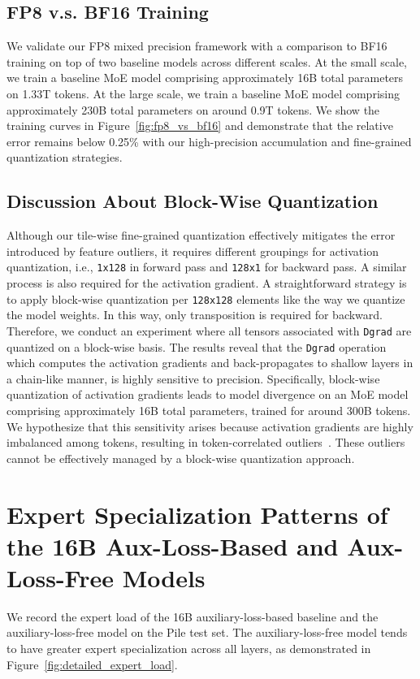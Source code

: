 \documentclass[11pt, a4paper, logo, copyright, nonumbering]{deepseek}
\begin{document}
\begin{CJK*}{UTF8}{gbsn}
\subsection{FP8 v.s. BF16 Training}
\label{app:fp8_cp_bf16}
We validate our FP8 mixed precision framework with a comparison to BF16 training on top of two baseline models across different scales. At the small scale, we train a baseline MoE model comprising approximately 16B total parameters on 1.33T tokens. 
At the large scale, we train a baseline MoE model comprising approximately 230B total parameters on around 0.9T tokens. We show the training curves in Figure~\ref{fig:fp8_vs_bf16} and demonstrate that the relative error remains below 0.25\% with our high-precision accumulation and fine-grained quantization strategies.

\subsection{Discussion About Block-Wise Quantization}
\label{app:fp8_blockwise}
Although our tile-wise fine-grained quantization effectively mitigates the error introduced by feature outliers, it requires different groupings for activation quantization, i.e., \texttt{1x128} in forward pass and \texttt{128x1} for backward pass. 
A similar process is also required for the activation gradient. 
A straightforward strategy is to apply block-wise quantization per \texttt{128x128} elements like the way we quantize the model weights.
In this way, only transposition is required for backward.
Therefore, we conduct an experiment where all tensors associated with \texttt{Dgrad} are quantized on a block-wise basis. 
The results reveal that the \texttt{Dgrad} operation which computes the activation gradients and back-propagates to shallow layers in a chain-like manner, is highly sensitive to precision. 
Specifically, block-wise quantization of activation gradients leads to model divergence on an MoE model comprising approximately 16B total parameters, trained for around 300B tokens. 
We hypothesize that this sensitivity arises because activation gradients are highly imbalanced among tokens, resulting in token-correlated outliers~\citep{int4train}. 
These outliers cannot be effectively managed by a block-wise quantization approach.

\section{Expert Specialization Patterns of the 16B Aux-Loss-Based and Aux-Loss-Free Models}
\label{app:detailed_expert_load}
We record the expert load of the 16B auxiliary-loss-based baseline and the auxiliary-loss-free model on the Pile test set. 
The auxiliary-loss-free model tends to have greater expert specialization across all layers, as demonstrated in Figure~\ref{fig:detailed_expert_load}.


\end{CJK*}
\end{document}
